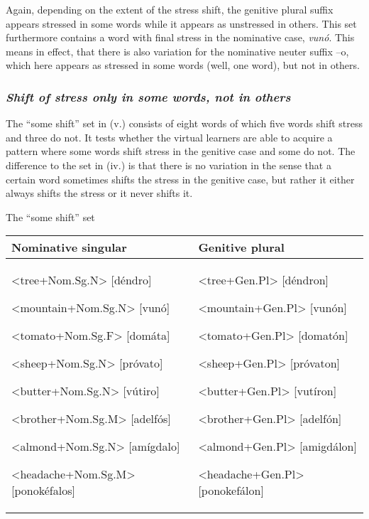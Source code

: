 \documentclass[a4paper]{article}
\begin{document}
Again, depending on the extent of the stress shift, the genitive plural suffix appears stressed in some words while it appears as unstressed in others. This set furthermore contains a word with final stress in the nominative case, \textit{vunó}. This means in effect, that there is also variation for the nominative neuter suffix –o, which here appears as stressed in some words (well, one word), but not in others.

\subsubsection{{\itshape
Shift of stress only in some words, not in others}}

The “some shift” set in (v.) consists of eight words of which five words shift stress and three do not. It tests whether the virtual learners are able to acquire a pattern where some words shift stress in the genitive case and some do not. The difference to the set in (iv.) is that there is no variation in the sense that a certain word sometimes shifts the stress in the genitive case, but rather it either always shifts the stress or it never shifts it.


\ea The “some shift” set

\begin{center}
\tablehead{}
\begin{supertabular}{m{2.68096in}|m{2.41706in}}
 Nominative singular &
 Genitive plural\\\hline
{ {\textless}tree+Nom.Sg.N{\textgreater} [déndro] \ \ }

{ {\textless}mountain+Nom.Sg.N{\textgreater} [vunó] }

{ {\textless}tomato+Nom.Sg.F{\textgreater} [domáta] }

{ {\textless}sheep+Nom.Sg.N{\textgreater} [próvato] }

{ {\textless}butter+Nom.Sg.N{\textgreater} [vútiro] }

{ {\textless}brother+Nom.Sg.M{\textgreater} [adelfós] }

{ {\textless}almond+Nom.Sg.N{\textgreater} [amígdalo] }

 {\textless}headache+Nom.Sg.M{\textgreater} [ponokéfalos]  &
{ {\textless}tree+Gen.Pl{\textgreater} [déndron] \ \ }

{ {\textless}mountain+Gen.Pl{\textgreater} [vunón] }

{ {\textless}tomato+Gen.Pl{\textgreater} [domatón] }

{ {\textless}sheep+Gen.Pl{\textgreater} [próvaton] }

{ {\textless}butter+Gen.Pl{\textgreater} [vutíron] }

{ {\textless}brother+Gen.Pl{\textgreater} [adelfón] }

{ {\textless}almond+Gen.Pl{\textgreater} [amigdálon] }

 {\textless}headache+Gen.Pl{\textgreater} [ponokefálon] \\
\end{supertabular}
\end{center}
\z
\end{document}
